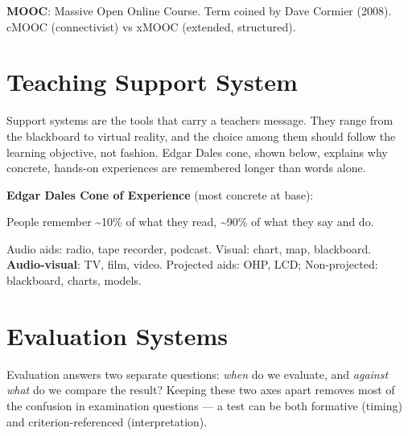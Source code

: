 \endgroup

\textbf{MOOC}: Massive Open Online Course. Term coined by Dave Cormier (2008). cMOOC (connectivist) vs xMOOC (extended, structured).

\needspace{125pt}

\hypertarget{p1-01--5-teaching-support-system}{%
\section{Teaching Support System}\label{p1-01--5-teaching-support-system}}

Support systems are the tools that carry a teacher\textquotesingle s message. They range from the blackboard to virtual
reality, and the choice among them should follow the learning objective, not fashion. Edgar Dale\textquotesingle s cone,
shown below, explains why concrete, hands-on experiences are remembered longer than words alone.



\textbf{Edgar Dale\textquotesingle s Cone of Experience} (most concrete at base):



People remember \textasciitilde10\% of what they read, \textasciitilde90\% of what they say and do.

Audio aids: radio, tape recorder, podcast. Visual: chart, map, blackboard. \textbf{Audio-visual}: TV, film, video.
Projected aids: OHP, LCD; Non-projected: blackboard, charts, models.

\needspace{125pt}

\hypertarget{p1-01--6-evaluation-systems}{%
\section{Evaluation Systems}\label{p1-01--6-evaluation-systems}}

Evaluation answers two separate questions: \emph{when} do we evaluate, and \emph{against what} do we compare the
result? Keeping these two axes apart removes most of the confusion in examination questions --- a test can
be both formative (timing) and criterion-referenced (interpretation).



\begingroup\small

